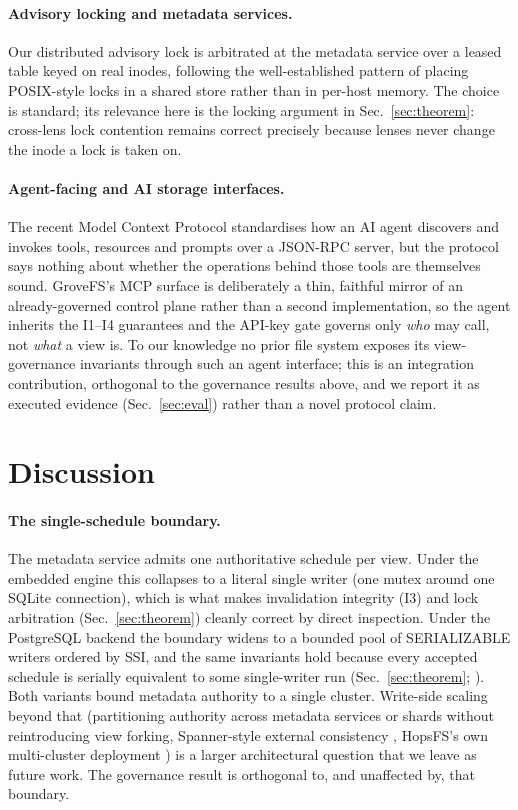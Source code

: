 \documentclass[numberedsection,acmtos]{acmart}
\begin{document}
\paragraph{Advisory locking and metadata services.}
Our distributed advisory lock is arbitrated at the metadata service over a
leased table keyed on real inodes, following the well-established pattern of
placing POSIX-style locks in a shared store rather than in per-host memory. The
choice is standard; its relevance here is the locking argument in
Sec.~\ref{sec:theorem}: cross-lens lock
contention remains correct precisely because lenses never change the inode a
lock is taken on.

\paragraph{Agent-facing and AI storage interfaces.}
The recent Model Context Protocol \citep{mcp} standardises how an AI agent
discovers and invokes tools, resources and prompts over a JSON-RPC server, but
the protocol says nothing about whether the operations behind those tools are
themselves sound. GroveFS's MCP surface is deliberately a thin, faithful mirror
of an already-governed control plane rather than a second implementation, so the
agent inherits the I1--I4 guarantees and the API-key gate governs only
\emph{who} may call, not \emph{what} a view is. To our knowledge no prior file system exposes its
view-governance invariants through such an agent interface; this is an
integration contribution, orthogonal to the governance results above, and we
report it as executed evidence (Sec.~\ref{sec:eval}) rather than a novel
protocol claim.

\section{Discussion}
\label{sec:discussion}

\paragraph{The single-schedule boundary.}
The metadata service admits one authoritative schedule per view. Under
the embedded engine this collapses to a literal single writer (one mutex
around one SQLite connection), which is what makes invalidation integrity (I3)
and lock arbitration (Sec.~\ref{sec:theorem}) cleanly correct by direct
inspection. Under the PostgreSQL backend the boundary widens to a bounded pool
of SERIALIZABLE writers ordered by SSI, and the same invariants hold because
every accepted schedule is serially equivalent to some single-writer run
(Sec.~\ref{sec:theorem}; \citep{ports2012,hopsfs}). Both variants bound
metadata authority to a single cluster. Write-side scaling beyond that
(partitioning authority across metadata services or shards without
reintroducing view forking, Spanner-style external consistency
\citep{spanner}, HopsFS's own multi-cluster deployment \citep{hopsfs}) is a
larger architectural question that we leave as future work. The governance result
is orthogonal to, and unaffected by, that boundary.
\end{document}
